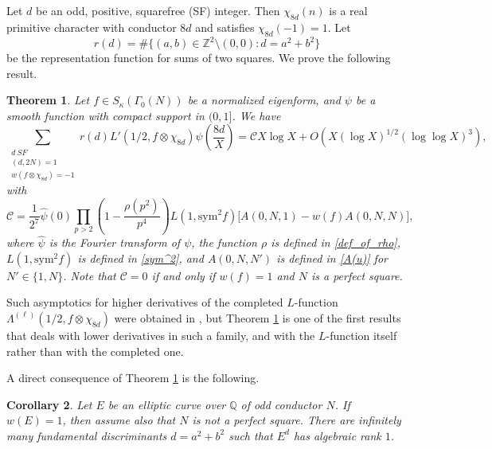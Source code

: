 \documentclass[12pt]{amsart}
\def\Z{\mathbb{Z}}
\def\Q{\mathbb{Q}}
\newtheorem{theorem}{Theorem}
\newtheorem{corollary}[theorem]{Corollary}
\def\Z{\mathbb Z}
\def\Q{\mathbb Q}
\def\Z{\mathbb Z}
\def\Q{\mathbb Q}
\def\log{\operatorname{log}}
\begin{document}
Let $d$ be an odd, positive, squarefree (SF) integer. Then $\chi_{8d}(n)$ is a real primitive character with conductor $8d$ and satisfies $\chi_{8d}(-1)=1$. Let $$r(d)=\#\{(a,b)\in \Z^2\setminus (0,0): d=a^2+b^2\}$$ be the representation function for sums of two squares.  We prove the following result.
\begin{theorem}\label{MainTheorem}
Let $f\in S_{\kappa}(\Gamma_0(N))$ be a normalized eigenform, %
and $\psi$ be a smooth function with compact support in $(0,1]$. We have
    \[\sum_{\substack{d \ SF\\(d,2N)=1\\w(f\otimes\chi_{8d})=-1}}r(d)L'(1/2,f\otimes\chi_{8d})\psi\left(\frac{8d}{X}\right)=\mathcal{C}X\log X+O(X(\log X)^{1/2}(\log\log X)^3),\]
    with 
    \[\mathcal{C}=\frac{1}{2^7}\hat{\psi}(0)\prod_{p>2} \left( 1- \frac{\rho(p^2)}{p^4} \right)L(1,\text{sym}^2f)\Big[A(0,N,1)-w(f)A(0,N,N)\Big],
    \]
    where $\hat{\psi}$ is the Fourier transform of $\psi$, the function $\rho$ is defined in \eqref{def_of_rho}, $L(1,\text{sym}^2f)$ is defined in \eqref{sym^2}, and $A(0,N,N')$ is defined in \eqref{A(u)} for $N'\in\{1,N\}$. Note that $\mathcal{C}=0$ if and only if $w(f)=1$ and $N$ is a perfect square.
\end{theorem}
Such asymptotics for higher derivatives of the completed $L$-function $\Lambda^{(\ell)
}(1/2,f\otimes\chi_{8d})$ were obtained in \cite{Munshi1}, but Theorem \ref{MainTheorem} is one of the first results that deals with lower derivatives in such a family, and with the $L$-function itself rather than with the completed one. 




A direct consequence of Theorem \ref{MainTheorem} is the following.

 \begin{corollary}\label{MainCorollary}
    Let $E$ be an elliptic curve over $\Q$ of odd conductor $N$. If $w(E)=1$, then assume also that $N$ is not a perfect square. There are infinitely many fundamental discriminants $d=a^2+b^2$ such that $E^d$ has algebraic rank $1$.
\end{corollary}
\end{document}
